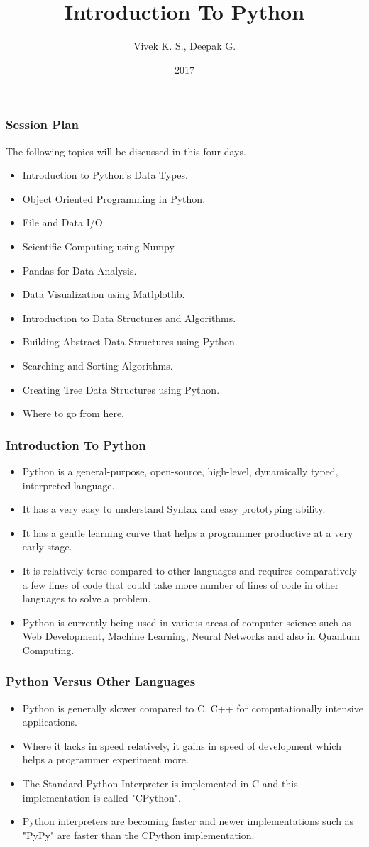 \documentclass{beamer}
\title{Introduction To Python}
\author{Vivek K. S., Deepak G.}
\institute{Information Systems Decision Sciences (ISDS)\\
MUMA College of Business\\
University of South Florida \\
Tampa, Florida}
\date{2017}
\begin{document}
 
\frame{\titlepage}

\begin{frame}
\frametitle{Session Plan}
The following topics will be discussed in this four days.
\begin{itemize}
\item Introduction to Python's Data Types.
\item Object Oriented Programming in Python.
\item File and Data I/O.
\item Scientific Computing using Numpy. 
\item Pandas for Data Analysis.
\item Data Visualization using Matlplotlib.
\item Introduction to Data Structures and Algorithms.
\item Building Abstract Data Structures using Python.
\item Searching and Sorting Algorithms.
\item Creating Tree Data Structures using Python.
\item Where to go from here. 
\end{itemize}
\end{frame}
 
\begin{frame}
\frametitle{Introduction To Python}
\begin{itemize}
\item Python is a general-purpose, open-source, high-level, dynamically typed, interpreted language.
\item It has a very easy to understand Syntax and easy prototyping ability.
\item It has a gentle learning curve that helps a  programmer productive at a very early stage.
\item It is relatively terse compared to other languages and requires comparatively  a few lines of code that could take more number of lines of code in other languages to solve a problem.
\item Python is currently being used in various areas of computer science such as Web Development, Machine Learning, Neural Networks and also in Quantum Computing.
\end{itemize}
\end{frame}

\begin{frame}
\frametitle{Python Versus Other Languages}
\begin{itemize}
\item Python is generally slower compared to C, C++ for computationally intensive applications.
\item Where it lacks in speed relatively, it gains in speed of development which helps a programmer experiment more.
\item The Standard Python Interpreter is implemented in C and this implementation is called "CPython".
\item Python interpreters are becoming faster and newer implementations such as "PyPy" are faster than the CPython implementation.
\end{itemize}
\end{frame}
\end{document}
